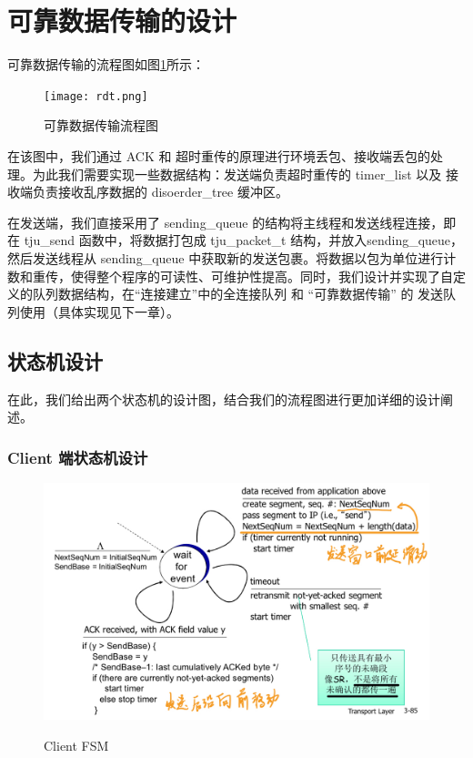 \section{可靠数据传输的设计}


可靠数据传输的流程图如图\ref{fig:rdt}所示：

\begin{figure}[!htbp]
    \centering
    \texttt{[image: rdt.png]}
    \label{fig:rdt}\caption{可靠数据传输流程图}
\end{figure}

在该图中，我们通过 ACK 和 超时重传的原理进行环境丢包、接收端丢包的处理。为此我们需要实现一些数据结构：发送端负责超时重传的 timer\_list 以及 接收端负责接收乱序数据的 disoerder\_tree 缓冲区。

在发送端，我们直接采用了 sending\_queue 的结构将主线程和发送线程连接，即在 tju\_send 函数中，将数据打包成 tju\_packet\_t 结构，并放入sending\_queue，然后发送线程从 sending\_queue 中获取新的发送包裹。将数据以包为单位进行计数和重传，使得整个程序的可读性、可维护性提高。同时，我们设计并实现了自定义的队列数据结构，在“连接建立”中的全连接队列 和 “可靠数据传输” 的 发送队列使用（具体实现见下一章）。


\subsection{状态机设计}

在此，我们给出两个状态机的设计图，结合我们的流程图进行更加详细的设计阐述。

\subsubsection*{Client 端状态机设计}

\begin{figure}[!htbp]
    \centering
    \includegraphics[width=1.0\textwidth]{figures/CLIENT_FSM.png}
    \label{fig:client_fsm}\caption{Client FSM}
  \end{figure}

